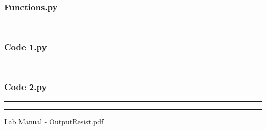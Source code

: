 \documentclass[letterpaper,12pt]{article}
\begin{document}
\subsubsection{Functions.py}
\noindent\rule{\textwidth}{1pt}

\noindent\rule{\textwidth}{1pt}

\pagebreak

\subsubsection{Code 1.py}
\noindent\rule{\textwidth}{1pt}

\noindent\rule{\textwidth}{1pt}

\pagebreak

\subsubsection{Code 2.py}
\noindent\rule{\textwidth}{1pt}

\noindent\rule{\textwidth}{1pt}

\pagebreak

\begin{thebibliography}{99}

 Lab Manual - OutputResist.pdf

\end{thebibliography}
\end{document}

